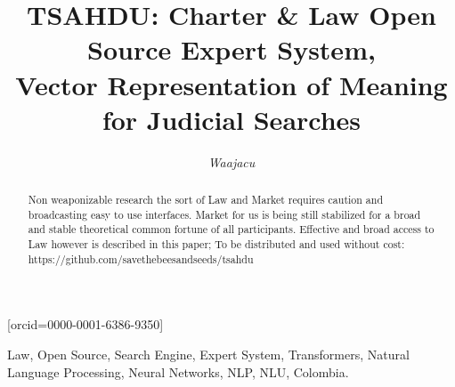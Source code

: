\documentclass[a4paper,fleqn]{cas-sc}
\begin{document}
\let\WriteBookmarks\relax
\def\floatpagepagefraction{1}
\def\textpagefraction{.001}

\title[mode = title]{TSAHDU: Charter \& Law Open Source Expert System, \\Vector Representation of Meaning for Judicial Searches}




  \author[1]{\textit{Waajacu}}[orcid=0000-0001-6386-9350]
  \cormark[1] 


  \address[1]{Santiago Restrepo Ruiz, Colombia.}





\begin{abstract}
  Non weaponizable research the sort of Law and Market requires caution and broadcasting easy to use interfaces. 
  Market for us is being still stabilized for a broad and stable theoretical common fortune of all participants. 
  Effective and broad access to Law however is described in this paper; To be distributed and used without cost: 
  https://github.com/savethebeesandseeds/tsahdu
  
\end{abstract}
 \begin{keywords}
  Law, Open Source, Search Engine, Expert System, Transformers, Natural Language Processing, Neural Networks, NLP, NLU, Colombia. 
 \end{keywords}
\end{document}
